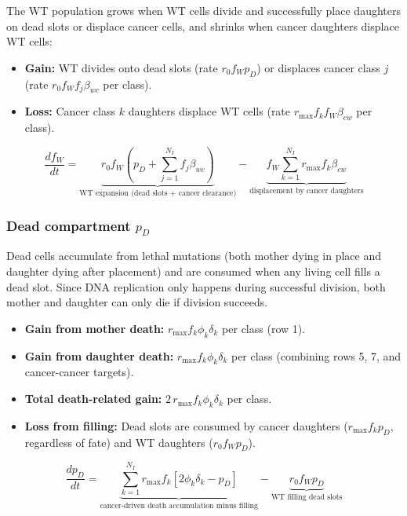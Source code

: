 \documentclass[11pt,a4paper]{article}
\begin{document}
The WT population grows when WT cells divide and successfully place daughters on dead slots or displace cancer cells, and shrinks when cancer daughters displace WT cells:

\begin{itemize}
    \item \textbf{Gain:} WT divides onto dead slots (rate $r_0 f_W p_D$) or displaces cancer class $j$ (rate $r_0 f_W f_j \beta_{wc}$ per class).
    \item \textbf{Loss:} Cancer class $k$ daughters displace WT cells (rate $r_{\text{max}} f_k f_W \beta_{cw}$ per class).
\end{itemize}

\begin{equation}
    \frac{df_W}{dt} = \underbrace{r_0 f_W \left( p_D + \sum_{j=1}^{N_I} f_j \beta_{wc} \right)}_{\text{WT expansion (dead slots + cancer clearance)}} - \underbrace{f_W \sum_{k=1}^{N_I} r_{\text{max}} f_k \beta_{cw}}_{\text{displacement by cancer daughters}}
\end{equation}

\subsubsection*{Dead compartment $p_D$}

Dead cells accumulate from lethal mutations (both mother dying in place and daughter dying after placement) and are consumed when any living cell fills a dead slot. Since DNA replication only happens during successful division, both mother and daughter can only die if division succeeds.

\begin{itemize}
    \item \textbf{Gain from mother death:} $r_{\text{max}} f_k \phi_k \delta_k$ per class (row 1).
    \item \textbf{Gain from daughter death:} $r_{\text{max}} f_k \phi_k \delta_k$ per class (combining rows 5, 7, and cancer-cancer targets).
    \item \textbf{Total death-related gain:} $2\, r_{\text{max}} f_k \phi_k \delta_k$ per class.
    \item \textbf{Loss from filling:} Dead slots are consumed by cancer daughters ($r_{\text{max}} f_k p_D$, regardless of fate) and WT daughters ($r_0 f_W p_D$).
\end{itemize}

\begin{equation}
    \frac{dp_D}{dt} = \underbrace{\sum_{k=1}^{N_I} r_{\text{max}} f_k \left[ 2 \phi_k \delta_k - p_D \right]}_{\text{cancer-driven death accumulation minus filling}} - \underbrace{r_0 f_W p_D}_{\text{WT filling dead slots}}
\end{equation}
\end{document}
